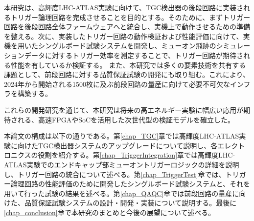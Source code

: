 本研究は、高輝度LHC-ATLAS実験に向けて、TGC検出器の後段回路に実装されるトリガー論理回路を完成させることを目的とする。そのために、まずトリガー回路を後段回路全体ファームウェアへと統合し、実機上で動作させるための準備を整える。次に、実装したトリガー回路の動作検証および性能評価に向けて、実機を用いたシングルボード試験システムを開発し、ミューオン飛跡のシミュレーションデータに対するトリガー効率を測定することで、トリガー回路が期待される性能を有しているか検証する。
また、本研究では多くの要素技術を共有する課題として、前段回路に対する品質保証試験の開発にも取り組む。これにより、2024年から開始される1500枚に及ぶ前段回路の量産に向けて必要不可欠なインフラを構築する。

これらの開発研究を通じて、本研究は将来の高エネルギー実験に幅広い応用が期待される、高速FPGAやSoCを活用した次世代型の検証モデルを確立した。

本論文の構成は以下の通りである。第\ref{chap_TGC}章では高輝度LHC-ATLAS実験に向けたTGC検出器システムのアップグレードについて説明し、各エレクトロニクスの役割を紹介する。第\ref{chap_TriggerIntegration}章では高輝度LHC-ATLAS実験でのエンドキャップ部ミューオントリガーロジックの詳細を説明し、トリガー回路の統合について述べる。第\ref{chap_TriggerTest}章では、トリガー論理回路の性能評価のために開発したシングルボード試験システムと、それを用いて行った試験の結果を述べる。第\ref{chap_QAQC}章では前段回路の量産に向けた、品質保証試験システムの設計・開発・実装について説明する。最後に\ref{chap_conclusion}章で本研究のまとめと今後の展望について述べる。